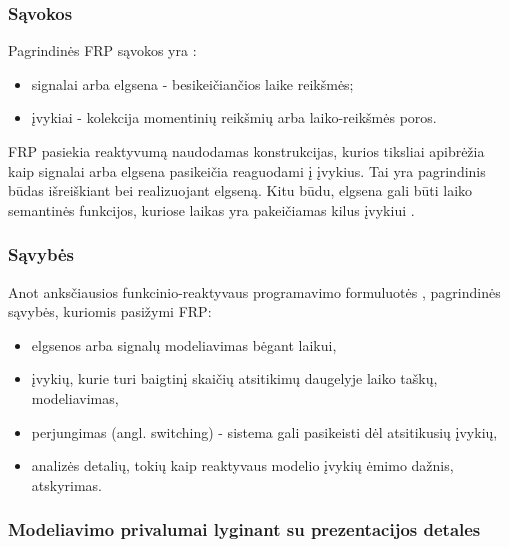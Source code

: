 \subsubsection{Sąvokos}

Pagrindinės FRP sąvokos yra \cite{ElliottHudak97:Fran}:

\begin{itemize}

	\item signalai arba elgsena - besikeičiančios laike reikšmės;

	\item įvykiai - kolekcija momentinių reikšmių arba laiko-reikšmės poros.

\end{itemize}

FRP pasiekia reaktyvumą naudodamas konstrukcijas, kurios tiksliai apibrėžia kaip signalai arba elgsena pasikeičia reaguodami į įvykius. Tai yra pagrindinis būdas išreiškiant bei realizuojant elgseną. Kitu būdu, elgsena gali būti laiko semantinės funkcijos, kuriose laikas yra pakeičiamas kilus įvykiui \cite{Nilsson:2002:FRP:581690.581695}.

\subsubsection{Sąvybės}

Anot anksčiausios funkcinio-reaktyvaus programavimo formuluotės \cite{ElliottHudak97:Fran}, pagrindinės sąvybės, kuriomis pasižymi FRP:

\begin{itemize}

	\item elgsenos arba signalų modeliavimas bėgant laikui,

	\item įvykių, kurie turi baigtinį skaičių atsitikimų daugelyje laiko taškų, modeliavimas,

	\item perjungimas (angl. switching) - sistema gali pasikeisti dėl atsitikusių įvykių,

	\item analizės detalių, tokių kaip reaktyvaus modelio įvykių ėmimo dažnis, atskyrimas.

\end{itemize}



\subsubsection{Modeliavimo privalumai lyginant su prezentacijos detales}

